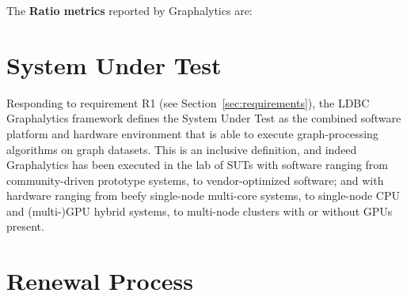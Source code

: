 The {\bf Ratio metrics} reported by Graphalytics are:

\begin{itemize}
\end{itemize}











\section{System Under Test} \label{sec:sut}

Responding to requirement R1 (see Section~\ref{sec:requirements}), the LDBC Graphalytics framework defines the System Under Test as the combined software platform and hardware environment that is able to execute graph-processing algorithms on graph datasets. This is an inclusive definition, and indeed Graphalytics has been executed in the lab of SUTs with software ranging from community-driven prototype systems, to vendor-optimized software; and with hardware ranging from beefy single-node multi-core systems, to single-node CPU and (multi-)GPU hybrid systems, to multi-node clusters with or without GPUs present. 


\section{Renewal Process} \label{sec:renewal}


